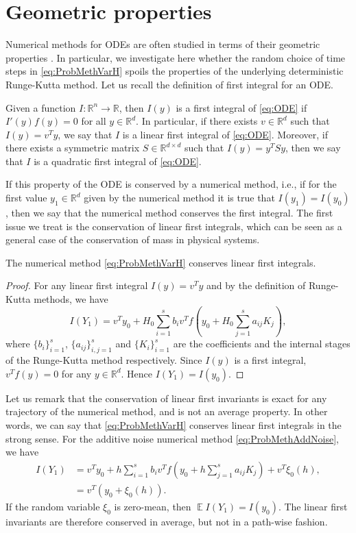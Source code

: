 \documentclass{siamart1116}
\numberwithin{theorem}{section}
\newcommand{\R}{\mathbb{R}}
\newcommand{\E}{\operatorname{\mathbb{E}}}
\newcommand{\sksum}{\textstyle\sum}
\begin{document}
\section{Geometric properties}
Numerical methods for ODEs are often studied in terms of their geometric properties \cite{HLW06}. In particular, we investigate here whether the random choice of time steps in \eqref{eq:ProbMethVarH} spoils the properties of the underlying deterministic Runge-Kutta method. Let us recall the definition of first integral for an ODE.
\begin{definition} Given a function $I\colon\R^n\to\R$, then $I(y)$ is a first integral of \eqref{eq:ODE} if $I'(y)f(y) = 0$ for all $y \in \R^d$. In particular, if there exists $v \in \R^d$ such that $I(y) = v^Ty$, we say that $I$ is a linear first integral of \eqref{eq:ODE}. Moreover, if there exists a symmetric matrix $S \in \R^{d\times d}$ such that $I(y) = y^TSy$, then we say that $I$ is a quadratic first integral of \eqref{eq:ODE}.
\end{definition}
If this property of the ODE is conserved by a numerical method, i.e., if for the first value $y_1\in\R^d$  given by the numerical method it is true that $I(y_1) = I(y_0)$, then we say that the numerical method conserves the first integral. The first issue we treat is the conservation of linear first integrals, which can be seen as a general case of the conservation of mass in physical systems.
\begin{theorem} The numerical method \eqref{eq:ProbMethVarH} conserves linear first integrals.
\end{theorem}
\begin{proof} For any linear first integral $I(y) = v^T y$ and by the definition of Runge-Kutta methods, we have
	\begin{equation}
		I(Y_1) = v^T y_0 + H_0 \sksum_{i=1}^s b_iv^T f(y_0 + H_0\sksum_{j=1}^{s} a_{ij}K_j),
	\end{equation}
	where $\{b_i\}_{i=1}^s$, $\{a_{ij}\}_{i,j=1}^s$ and $\{K_i\}_{i=1}^s$ are the coefficients and the internal stages of the Runge-Kutta method respectively. Since $I(y)$ is a first integral, $v^T f(y) = 0$ for any $y \in \R^d$. Hence $I(Y_1)  = I(y_0)$.
\end{proof}
\begin{remark} Let us remark that the conservation of linear first invariants is exact for any trajectory of the numerical method, and is not an average property. In other words, we can say that \eqref{eq:ProbMethVarH} conserves linear first integrals in the strong sense. For the additive noise numerical method \eqref{eq:ProbMethAddNoise}, we have
	\begin{equation}
	\begin{aligned}
		I(Y_1) &= v^T y_0 + h \sksum_{i=1}^s b_iv^T f(y_0 + h\sksum_{j=1}^{s} a_{ij}K_j) + v^T \xi_0(h), \\
		&= v^T (y_0 + \xi_0(h)).
	\end{aligned}
	\end{equation}
	If the random variable $\xi_0$ is zero-mean, then $\E I(Y_1) = I(y_0)$. The linear first invariants are therefore conserved in average, but not in a path-wise fashion.
\end{remark}
\end{document}
